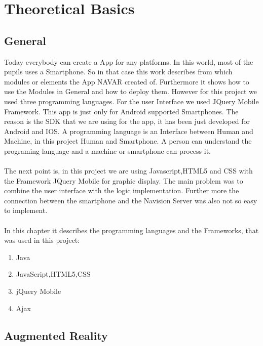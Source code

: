 \chapter{Theoretical Basics}
\section{General}
Today everybody can create a App for any platforms. In this world, most of the pupils uses a Smartphone. So in that case this work describes from which modules or elements  the App NAVAR created of.  Furthermore it shows how to use the Modules in General and how to deploy them. However for this project we used three programming languages. For the user Interface we used JQuery Mobile Framework. This app is just only for Android supported Smartphones. The reason is the SDK that  we are using for the app, it has been just developed for Android and IOS.  A programming language is an Interface between Human and Machine, in this project Human and Smartphone. A person can understand the programing language and a machine or smartphone can process it. 
\\\\
The next point is, in this project we are using Javascript,HTML5 and CSS with the Framework JQuery Mobile for graphic display. The main problem was to combine the user interface with the logic implementation. Further more the connection between the smartphone and the Navision Server was also not so easy to implement.
\\\\
In this chapter it describes the programming languages and the Frameworks, that was used in this project:
\begin{enumerate}
\item Java
\item JavaScript,HTML5,CSS
\item jQuery Mobile
\item Ajax
\end{enumerate}
\newpage
\section{Augmented Reality}

